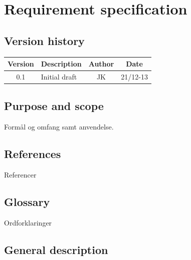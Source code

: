 



\chapter{Requirement specification}

\section{Version history}
\begin{table}[H]
\begin{tabular}{|c|p{9cm}|c|c|}
\hline
Version & Description & Author & Date\\
\hline
0.1 & Initial draft & JK & 21/12-13\\
\hline
\end{tabular}
\end{table}

\section{Purpose and scope}
Formål og omfang samt anvendelse.

\section{References}
Referencer

\section{Glossary}
Ordforklaringer

\section{General description}

